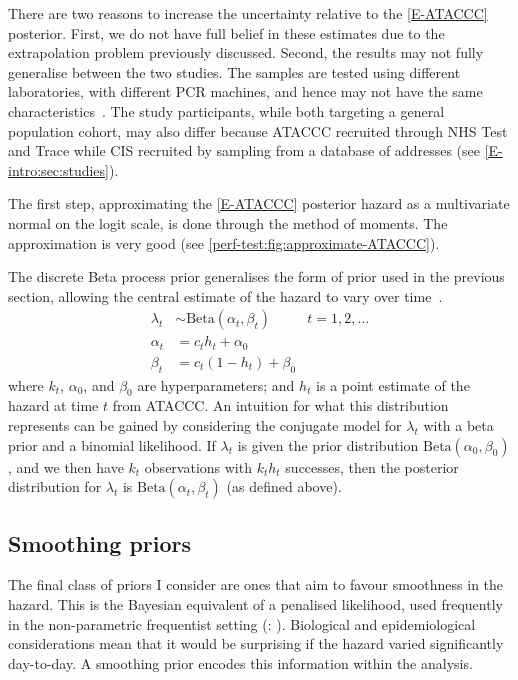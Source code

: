 \documentclass[thesis.tex]{subfiles}
\begin{document}
There are two reasons to increase the uncertainty relative to the \cref{E-ATACCC} posterior.
First, we do not have full belief in these estimates due to the extrapolation problem previously discussed.
Second, the results may not fully generalise between the two studies.
The samples are tested using different laboratories, with different PCR machines, and hence may not have the same characteristics~\autocite{punchooLaboratory}.
The study participants, while both targeting a general population cohort, may also differ because ATACCC recruited through NHS Test and Trace while CIS recruited by sampling from a database of addresses (see \cref{E-intro:sec:studies}).

The first step, approximating the \cref{E-ATACCC} posterior hazard as a multivariate normal on the logit scale, is done through the method of moments.
The approximation is very good (see \cref{perf-test:fig:approximate-ATACCC}).

The discrete Beta process prior generalises the form of prior used in the previous section, allowing the central estimate of the hazard to vary over time~\autocites{ibrahimBayesian}{sunStatisticala}.
\begin{align}
  \lambda_t &\sim \text{Beta}(\alpha_t, \beta_t) &t = 1, 2, \dots \\
  \alpha_t &= c_t h_t + \alpha_0 \\
  \beta_t &= c_t (1 - h_t) + \beta_0
\end{align}
where $k_t$, $\alpha_0$, and $\beta_0$ are hyperparameters; and $h_t$ is a point estimate of the hazard at time $t$ from ATACCC.
An intuition for what this distribution represents can be gained by considering the conjugate model for $\lambda_t$ with a beta prior and a binomial likelihood.
If $\lambda_t$ is given the prior distribution $\text{Beta}(\alpha_0, \beta_0)$, and we then have $k_t$ observations with $k_t h_t$ successes, then the posterior distribution for $\lambda_t$ is $\text{Beta}(\alpha_t, \beta_t)$ (as defined above).


\subsection{Smoothing priors}
The final class of priors I consider are ones that aim to favour smoothness in the hazard.
This is the Bayesian equivalent of a penalised likelihood, used frequently in the non-parametric frequentist setting (\eg: \autocite{bacchettiNonparametric}).
Biological and epidemiological considerations mean that it would be surprising if the hazard varied significantly day-to-day.
A smoothing prior encodes this information within the analysis.
\end{document}
